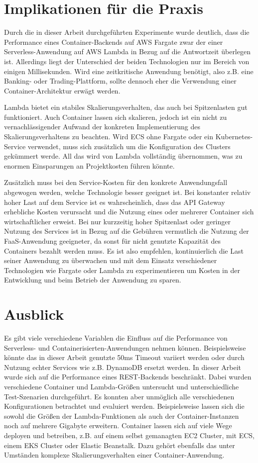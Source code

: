 \section{Implikationen für die Praxis}
Durch die in dieser Arbeit durchgeführten Experimente wurde deutlich, dass die Performance eines Container-Backends auf AWS Fargate zwar der einer Serverless-Anwendung auf AWS Lambda in Bezug auf die Antwortzeit überlegen ist. Allerdings liegt der Unterschied der beiden Technologien nur im Bereich von einigen Millisekunden. Wird eine zeitkritische Anwendung benötigt, also z.B. eine Banking- oder Trading-Plattform, sollte dennoch eher die Verwendung einer Container-Architektur erwägt werden.

Lambda bietet ein stabiles Skalierungsverhalten, das auch bei Spitzenlasten gut funktioniert. Auch Container lassen sich skalieren, jedoch ist ein nicht zu vernachlässigender Aufwand der konkreten Implementierung des Skalierungsverhaltens zu beachten. Wird ECS ohne Fargate oder ein Kubernetes-Service verwendet, muss sich zusätzlich um die Konfiguration des Clusters gekümmert werde. All das wird von Lambda vollständig übernommen, was zu enormen Einsparungen an Projektkosten führen könnte. 

Zusätzlich muss bei den Service-Kosten für den konkrete Anwendungsfall abgewogen werden, welche Technologie besser geeignet ist. Bei konstanter relativ hoher Last auf dem Service ist es wahrscheinlich, dass das API Gateway erhebliche Kosten verursacht und die Nutzung eines oder mehrerer Container sich wirtschaftlicher erweist. Bei nur kurzzeitig hoher Spitzenlast oder geringer Nutzung des Services ist in Bezug auf die Gebühren vermutlich die Nutzung der FaaS-Anwendung geeigneter, da sonst für nicht genutzte Kapazität des Containers bezahlt werden muss. 
Es ist also empfehlen, kontinuierlich die Last seiner Anwendung zu überwachen und mit dem Einsatz verschiedener Technologien wie Fargate oder Lambda zu experimentieren um Kosten in der Entwicklung und beim Betrieb der Anwendung zu sparen.

\section{Ausblick}
Es gibt viele verschiedene Variablen die Einfluss auf die Performance von Serverless- und Containerisierten-Anwendungen nehmen können. Beispielsweise könnte das in dieser Arbeit genutzte 50ms Timeout variiert werden oder durch Nutzung echter Services wie z.B. DynamoDB ersetzt werden. In dieser Arbeit wurde sich auf die Performance eines REST-Backends beschränkt. Dabei wurden verschiedene Container und Lambda-Größen untersucht und unterschiedliche Test-Szenarien durchgeführt. Es konnten aber unmöglich alle verschiedenen Konfigurationen betrachtet und evaluiert werden. Beispielsweise lassen sich die sowohl die Größen der Lambda-Funktionen als auch der Container-Instanzen noch auf mehrere Gigabyte erweitern. Container lassen sich auf viele Wege deployen und betreiben, z.B. auf einem selbst gemanagten EC2 Cluster, mit ECS, einem EKS Cluster oder Elastic Beanstalk. Dazu gehört ebenfalls das unter Umständen komplexe Skalierungsverhalten einer Container-Anwendung.


